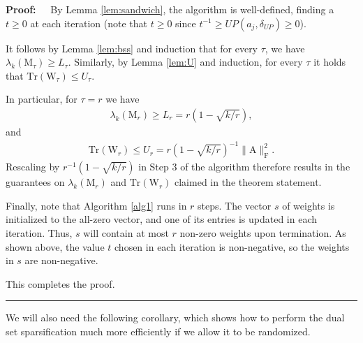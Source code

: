 \documentclass[11pt]{article}
\newcommand{\Trace }[1]{\mbox{}{\mathrm{Tr}}\left(#1\right)}
\newcommand{\FNormS}[1]{\mbox{}\|#1\|_\mathrm{F}^2}
\newenvironment{proof}{\begin{trivlist} \item {\bf Proof:~~}}
  {\qed\end{trivlist}}
\newcommand{\mat}[1]{{\ensuremath{\bm{\mathrm{#1}}}}}
\def\matA{\mat{A}}
\def\matM{\mat{M}}
\def\matW{\mat{W}}
\def\qed{\hfill\rule{2mm}{2mm}}
\begin{document}
\begin{proof}
By Lemma \ref{lem:sandwich}, the algorithm is well-defined, finding a $t \geq 0$ at each iteration
(note that $t \geq 0$ since $t^{-1} \geq UP(a_j, \delta_{UP}) \geq 0$). 

It follows by Lemma \ref{lem:bss} and induction that for every $\tau$, we have $\lambda_k(\matM_{\tau}) \geq L_{\tau}$. 
Similarly, by
Lemma \ref{lem:U} and induction, for every $\tau$ it holds that $\Trace{\matW_{\tau}} \leq U_{\tau}$. 

In particular, for $\tau = r$ we have
\begin{eqnarray}\label{eqn:Lfinal}
\lambda_k(\matM_r) \geq L_r = r(1-\sqrt{k/r}), 
\end{eqnarray}
and
\begin{eqnarray}\label{eqn:Ufinal}
\Trace{\matW_r} \leq U_r = r ( 1- \sqrt{k/r})^{-1} \FNormS{\matA}.
\end{eqnarray}
Rescaling by $r^{-1}(1-\sqrt{k/r})$ in Step 3 of the algorithm therefore results in the guarantees on $\lambda_k(\matM_r)$
and $\Trace{\matW_r}$ claimed in the theorem statement. 

Finally, note that Algorithm \ref{alg1} runs in $r$ steps. 
The vector $s$ of weights is initialized to the all-zero 
vector, and one of its entries is updated in each iteration. Thus, $s$ will contain at most $r$
non-zero weights upon termination. As shown above, the value $t$ chosen in each iteration 
is non-negative, so the weights in $s$ are non-negative.

This completes the proof. 
\end{proof}

We will also need the following corollary, which shows how to perform the dual set sparsification much more
efficiently if we allow it to be randomized. 
\end{document}
